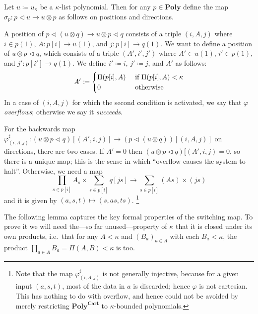 \documentclass[11pt, one side, article]{memoir}
\theoremstyle{definition}
\theoremstyle{plain}
\newenvironment{definition}
  {\pushQED{\qed}\renewcommand{\qedsymbol}{$\lozenge$}\definitionx}
  {\popQED\enddefinitionx}
\newcommand{\Cat}[1]{\mathbf{#1}}%
\newcommand{\tn}[1]{\textnormal{#1}}
\newcommand{\poly}{\Cat{Poly}}
\newcommand{\polycart}{\poly^{\Cat{Cart}}}
\newcommand{\0}{\textsf{0}}
\newcommand{\1}{\tn{\textsf{1}}}
\newcommand{\tri}{\mathbin{\triangleleft}}
\begin{document}
\begin{definition}[Switching map $\sigma$]\label{def.switching}
Let $u\coloneqq u_\kappa$ be a $\kappa$-list polynomial. Then for any $p\in\poly$ define the map $\sigma_p\colon p\tri u\to u\otimes p$ as follows on positions and directions.

A position of $p\tri(u\otimes q)\to u\otimes p\tri q$ consists of a triple $(i,A,j)$ where $i\in p(1)$, $A\colon p[i]\to u(1)$, and $j\colon p[i]\to q(1)$. We want to define a position of $u\otimes p\tri q$, which consists of a triple $(A',i',j')$ where $A'\in u(1)$, $i'\in p(1)$, and $j'\colon p[i']\to q(1)$. We define $i'\coloneqq i$, $j'\coloneqq j$, and $A'$ as follows:
\begin{equation}\label{eqn.overflow}
  A'\coloneqq
  \begin{cases}
  	\Pi(p[i],A)&\tn{ if }\Pi(p[i],A)<\kappa\\
		0&\tn{ otherwise}
  \end{cases}
\end{equation}
In a case of $(i,A,j)$ for which the second condition is activated, we say that $\varphi$ \emph{overflows}; otherwise we say it \emph{succeeds}.

For the backwards map $\varphi^\sharp_{(i,A,j)}\colon (u\otimes p\tri q)[(A',i,j)]\to(p\tri(u\otimes q))[(i,A,j)]$ on directions, there are two cases. If $A'=0$ then $(u\otimes p\tri q)[(A',i,j)=0$, so there is a unique map; this is the sense in which ``overflow causes the system to halt''. Otherwise, we need a map
\begin{equation}\label{eqn.not_injective}
\prod_{s\in p[i]}A_s\times\sum_{s\in p[i]}q[js]\to\sum_{s\in p[i]}(A s)\times (js)
\end{equation}
and it is given by $(a,s,t)\mapsto(s,as,ts)$.%
\footnote{Note that the map $\varphi^\sharp_{(i,A,j)}$ is not generally injective, because for a given input $(a,s,t)$, most of the data in $a$ is discarded; hence $\varphi$ is not cartesian. This has nothing to do with overflow, and hence could not be avoided by merely restricting $\polycart$ to $\kappa$-bounded polynomials.}
\end{definition}

The following lemma captures the key formal properties of the switching map. To prove it we will need the---so far unused---property of $\kappa$ that it is closed under its own products, i.e.\ that for any $A<\kappa$ and $(B_a)_{a\in A}$ with each $B_a<\kappa$, the product $\prod_{a\in A}B_a=\Pi(A,B)<\kappa$ is too.
\end{document}
